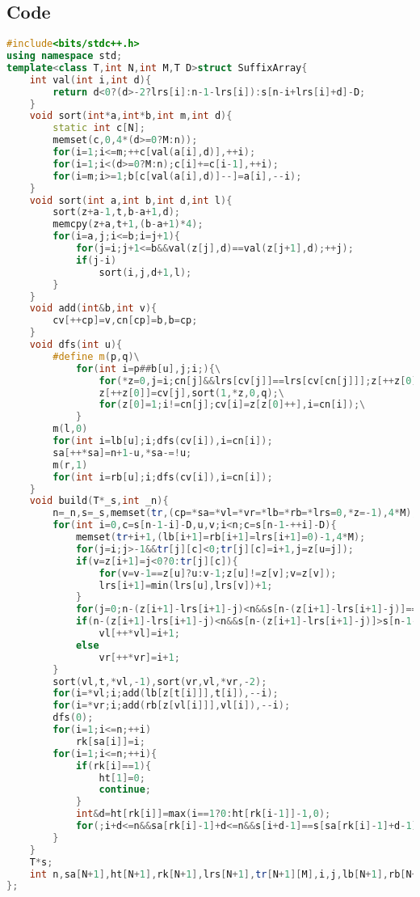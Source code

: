 \documentclass{book}
\begin{document}
\subsection*{Code}
\begin{lstlisting}[language=C++,title={Suffix Array (Factor Oracle).hpp (2640 bytes, 71 lines)}]
#include<bits/stdc++.h>
using namespace std;
template<class T,int N,int M,T D>struct SuffixArray{
    int val(int i,int d){
        return d<0?(d>-2?lrs[i]:n-1-lrs[i]):s[n-i+lrs[i]+d]-D;
    }
    void sort(int*a,int*b,int m,int d){
        static int c[N];
        memset(c,0,4*(d>=0?M:n));
        for(i=1;i<=m;++c[val(a[i],d)],++i);
        for(i=1;i<(d>=0?M:n);c[i]+=c[i-1],++i);
        for(i=m;i>=1;b[c[val(a[i],d)]--]=a[i],--i);
    }
    void sort(int a,int b,int d,int l){
        sort(z+a-1,t,b-a+1,d);
        memcpy(z+a,t+1,(b-a+1)*4);
        for(i=a,j;i<=b;i=j+1){
            for(j=i;j+1<=b&&val(z[j],d)==val(z[j+1],d);++j);
            if(j-i)
                sort(i,j,d+1,l);
        }
    }
    void add(int&b,int v){
        cv[++cp]=v,cn[cp]=b,b=cp;
    }
    void dfs(int u){
        #define m(p,q)\
            for(int i=p##b[u],j;i;){\
                for(*z=0,j=i;cn[j]&&lrs[cv[j]]==lrs[cv[cn[j]]];z[++z[0]]=cv[j],j=cn[j]);\
                z[++z[0]]=cv[j],sort(1,*z,0,q);\
                for(z[0]=1;i!=cn[j];cv[i]=z[z[0]++],i=cn[i]);\
            }
        m(l,0)
        for(int i=lb[u];i;dfs(cv[i]),i=cn[i]);
        sa[++*sa]=n+1-u,*sa-=!u;
        m(r,1)
        for(int i=rb[u];i;dfs(cv[i]),i=cn[i]);
    }
    void build(T*_s,int _n){
        n=_n,s=_s,memset(tr,(cp=*sa=*vl=*vr=*lb=*rb=*lrs=0,*z=-1),4*M);
        for(int i=0,c=s[n-1-i]-D,u,v;i<n;c=s[n-1-++i]-D){
            memset(tr+i+1,(lb[i+1]=rb[i+1]=lrs[i+1]=0)-1,4*M);
            for(j=i;j>-1&&tr[j][c]<0;tr[j][c]=i+1,j=z[u=j]);
            if(v=z[i+1]=j<0?0:tr[j][c]){
                for(v=v-1==z[u]?u:v-1;z[u]!=z[v];v=z[v]);
                lrs[i+1]=min(lrs[u],lrs[v])+1;
            }
            for(j=0;n-(z[i+1]-lrs[i+1]-j)<n&&s[n-(z[i+1]-lrs[i+1]-j)]==s[n-1-i+lrs[i+1]+j];++j);
            if(n-(z[i+1]-lrs[i+1]-j)<n&&s[n-(z[i+1]-lrs[i+1]-j)]>s[n-1-i+lrs[i+1]+j])
                vl[++*vl]=i+1;
            else
                vr[++*vr]=i+1;
        }
        sort(vl,t,*vl,-1),sort(vr,vl,*vr,-2);
        for(i=*vl;i;add(lb[z[t[i]]],t[i]),--i);
        for(i=*vr;i;add(rb[z[vl[i]]],vl[i]),--i);
        dfs(0);
        for(i=1;i<=n;++i)
            rk[sa[i]]=i;
        for(i=1;i<=n;++i){
            if(rk[i]==1){
                ht[1]=0;
                continue;
            }
            int&d=ht[rk[i]]=max(i==1?0:ht[rk[i-1]]-1,0);
            for(;i+d<=n&&sa[rk[i]-1]+d<=n&&s[i+d-1]==s[sa[rk[i]-1]+d-1];++d);
        }
    }
    T*s;
    int n,sa[N+1],ht[N+1],rk[N+1],lrs[N+1],tr[N+1][M],i,j,lb[N+1],rb[N+1],cv[N+1],cn[N+1],cp,vl[N+1],vr[N+1],t[N+1],z[N+1];
};
\end{lstlisting}
\end{document}
